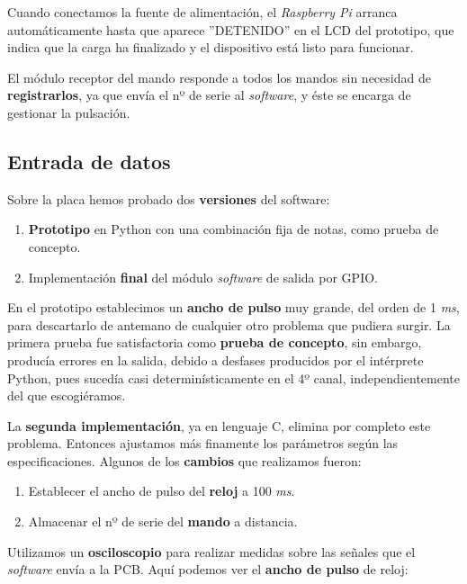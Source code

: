 \smallskip

Cuando conectamos la fuente de alimentación, el \textit{Raspberry Pi} arranca automáticamente hasta que aparece ''DETENIDO'' en el \acrshort{LCD} del prototipo, que indica que la carga ha finalizado y el dispositivo está listo para funcionar.

El módulo receptor del mando responde a todos los mandos sin necesidad de \textbf{registrarlos}, ya que envía el nº de serie al \textit{software}, y éste se encarga de gestionar la pulsación.

\subsection{Entrada de datos}

Sobre la placa hemos probado dos \textbf{versiones} del software:

\begin{enumerate}
	\item \textbf{Prototipo} en Python con una combinación fija de notas, como prueba de concepto.
	\item Implementación \textbf{final} del módulo \textit{software} de salida por \acrshort{GPIO}.
\end{enumerate}

En el prototipo establecimos un \textbf{ancho de pulso} muy grande, del orden de 1 \textit{ms}, para descartarlo de antemano de cualquier otro problema que pudiera surgir. La primera prueba fue satisfactoria como \textbf{prueba de concepto}, sin embargo, producía errores en la salida, debido a desfases producidos por el intérprete Python, pues sucedía casi determinísticamente en el 4º canal, independientemente del que escogiéramos.

La \textbf{segunda implementación}, ya en lenguaje C, elimina por completo este problema. Entonces ajustamos más finamente los parámetros según las especificaciones. Algunos de los \textbf{cambios} que realizamos fueron:

\begin{enumerate}
	\item Establecer el ancho de pulso del \textbf{reloj} a 100 \textit{ms}.
	\item Almacenar el nº de serie del \textbf{mando} a distancia.
\end{enumerate}

Utilizamos un \textbf{osciloscopio} para realizar medidas sobre las señales que el \textit{software} envía a la \acrshort{PCB}. Aquí podemos ver el \textbf{ancho de pulso} de reloj:

